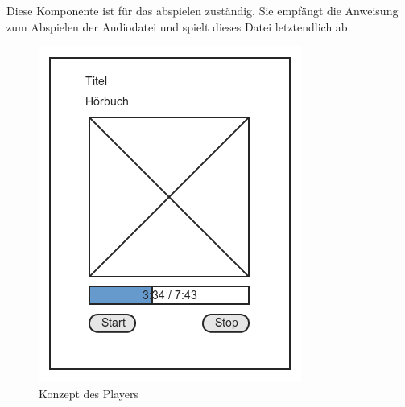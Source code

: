 Diese Komponente ist für das abspielen zuständig. Sie empfängt die Anweisung zum Abspielen der Audiodatei und spielt dieses Datei letztendlich ab.

\begin{figure}[ht]
\begin{minipage}[b]{0.45\linewidth}
\centering
\includegraphics[width=\textwidth]{images/playerkomp}
\caption{Konzept des Players}
\label{playerkomp}
\end{minipage}
\hspace{0.5cm}
\begin{minipage}[b]{0.45\linewidth}
\centering

\end{minipage}
\end{figure}
